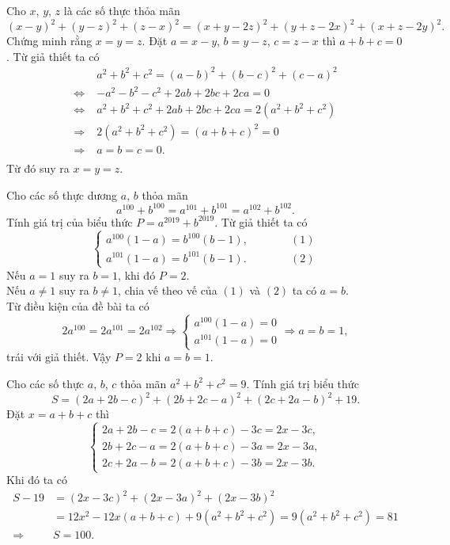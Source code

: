 \begin{vn}
Cho $x$, $y$, $z$ là các số thực thỏa mãn $$(x-y)^2+(y-z)^2+(z-x)^2=(x+y-2z)^2+(y+z-2x)^2+(x+z-2y)^2.$$
Chứng minh rằng $x=y=z.$
\loigiai
{
Đặt $a=x-y$, $b=y-z$, $c=z-x$ thì $a+b+c=0$. Từ giả thiết ta có
\begin{align*}
&a^2+b^2+c^2=(a-b)^2+(b-c)^2+(c-a)^2\\ 
\Leftrightarrow\;&-a^2-b^2-c^2+2ab+2bc+2ca=0\\
\Leftrightarrow\;&a^2+b^2+c^2+2ab+2bc+2ca=2\left(a^2+b^2+c^2\right)\\
\Rightarrow\;&2\left(a^2+b^2+c^2\right)=(a+b+c)^2=0\\
\Rightarrow\;&a=b=c=0.\\
\end{align*}
Từ đó suy ra $x=y=z$.
}
\end{vn}
\begin{vn}
Cho các số thực dương $a$, $b$ thỏa mãn $$a^{100}+b^{100}=a^{101}+b^{101}=a^{102}+b^{102}.$$
Tính giá trị của biểu thức $P=a^{2019}+b^{2019}$.
\loigiai
{
Từ giả thiết ta có
\[\begin{cases}
a^{100}(1-a)=b^{100}(b-1),&\qquad\quad (1)\\
a^{101}(1-a)=b^{101}(b-1).&\qquad\quad (2)
\end{cases}\]
Nếu $a=1$ suy ra $b=1$, khi đó $P=2$.\\
Nếu $a\ne 1$ suy ra $b\ne 1$, chia vế theo vế của $(1)$ và $(2)$ ta có $a=b$.\\
Từ điều kiện của đề bài ta có 
\[2a^{100}=2a^{101}=2a^{102}\Rightarrow \begin{cases}
a^{100}(1-a)=0\\
a^{101}(1-a)=0
\end{cases}\Rightarrow a=b=1,\]
trái với giả thiết. Vậy $P=2$ khi $a=b=1$.
}
\end{vn}

\begin{vn}
Cho các số thực $a$, $b$, $c$ thỏa mãn $a^2+b^2+c^2=9$. Tính giá trị biểu thức $$S=(2a+2b-c)^2+(2b+2c-a)^2+(2c+2a-b)^2+19.$$
\loigiai
{
Đặt $x=a+b+c$ thì 
\[\begin{cases}
2a+2b-c=2(a+b+c)-3c=2x-3c,\\
2b+2c-a=2(a+b+c)-3a=2x-3a,\\
2c+2a-b=2(a+b+c)-3b=2x-3b.
\end{cases}\]
Khi đó ta có
\begin{align*}
S-19&=(2x-3c)^2+(2x-3a)^2+(2x-3b)^2\\ 
&=12x^2-12x(a+b+c)+9(a^2+b^2+c^2)=9(a^2+b^2+c^2)=81\\
\Rightarrow\;&S=100.
\end{align*}
}
\end{vn}

